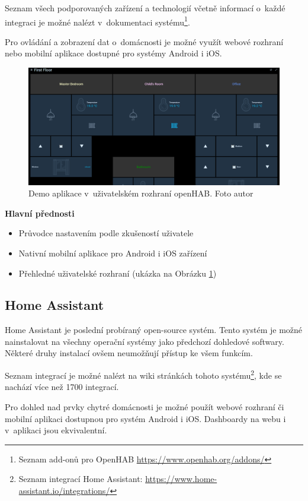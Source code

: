 Seznam všech podporovaných zařízení a technologií včetně informací o~každé integraci je možné nalézt v~dokumentaci systému\footnote{Seznam add-onů pro OpenHAB \url{https://www.openhab.org/addons/}}.

Pro ovládání a zobrazení dat o~domácnosti je možné využít webové rozhraní nebo mobilní aplikace dostupné pro systémy Android i iOS.
\begin{figure}[H]
	\centering
	\includegraphics[width=\textwidth]{obrazky-figures/smartHomeSystems/openHAB.png}
	\caption{Demo aplikace v~uživatelském rozhraní openHAB. Foto autor}
	\label{openHABImage}
\end{figure}

\noindent\textbf{Hlavní přednosti}
\begin{itemize}
  \item Průvodce nastavením podle zkušeností uživatele
  \item Nativní mobilní aplikace pro Android i iOS zařízení
  \item Přehledné uživatelské rozhraní (ukázka na Obrázku \ref{openHABImage})
  \end{itemize}

\subsection*{Home Assistant}
Home Assistant je poslední probíraný open-source systém. Tento systém je možné nainstalovat na všechny operační systémy jako předchozí dohledové softwary. Některé druhy instalací ovšem neumožňují přístup ke všem funkcím. 

Seznam integrací je možné nalézt na wiki stránkách tohoto systému\footnote{Seznam integrací Home Assistant: \url{https://www.home-assistant.io/integrations/}}, kde se nachází více než 1700 integrací.

Pro dohled nad prvky chytré domácnosti je možné použít webové rozhraní či mobilní aplikaci dostupnou pro systém Android i iOS. Dashboardy na webu i v~aplikaci jsou ekvivalentní.

